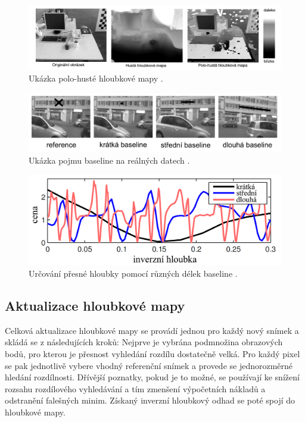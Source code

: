 \documentclass[12pt,a4paper]{report}
\begin{document}
\begin{figure}[H]
\centering
\includegraphics[scale=0.7]{img/hloubkova_mapa.jpg}
\caption{Ukázka polo-husté hloubkové mapy \cite{Semi-Dense_VO}.}
\label{5}
\end{figure}

\begin{figure}[H]
\centering
\includegraphics[scale=0.4]{img/baseline.jpg}
\caption{Ukázka pojmu baseline na reálných datech \cite{Semi-Dense_VO}.}
\label{6}
\end{figure}

\begin{figure}[H]
\centering
\includegraphics[scale=0.4]{img/baseline2.png}
\caption{Určování přesné hloubky pomocí různých délek baseline \cite{Semi-Dense_VO}.}
\label{6b}
\end{figure}

\subsection*{Aktualizace hloubkové mapy}
Celková aktualizace hloubkové mapy se provádí jednou pro každý nový snímek a skládá se z následujících kroků: Nejprve je vybrána podmnožina obrazových bodů, pro kterou je přesnost vyhledání rozdílu dostatečně velká. Pro každý pixel se pak jednotlivě vybere vhodný referenční snímek a provede se jednorozměrné hledání rozdílnosti. Dřívější poznatky, pokud je to možné, se používají ke snížení rozsahu rozdílového vyhledávání a tím zmenšení výpočetních nákladů a odstranění falešných minim. Získaný inverzní hloubkový odhad se poté spojí do hloubkové mapy.
\end{document}
